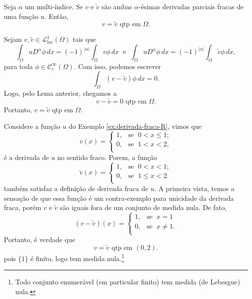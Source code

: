 \documentclass[a4paper, 11pt]{book}
\theoremstyle{definition}
\newcommand{\cC}{\mathcal{C}}
\newcommand{\cL}{\mathcal{L}}
\begin{document}
\begin{pbox}
    Seja $\alpha$ um multi-índice. Se $v$ e $\tilde v$ são ambas $\alpha$-ésimas derivadas parciais fracas de uma função $u$.
    Então,
    \[
        v = \tilde v \text{ qtp em } \Omega.
    \]
\end{pbox}
\begin{prf}
    Sejam $v, \tilde v \in \cL^1_{\mathrm{loc}}(\Omega)$ tais que
    \[
        \int_\Omega u D^\alpha \phi \,dx = (-1)^{|\alpha|} \int_\Omega v \phi \,dx \;\text{ e }\; \int_\Omega u D^\alpha \phi \, dx= (-1)^{|\alpha|}\int_\Omega \tilde v \phi \,dx,
    \]
    para toda $\phi \in \cC^\infty_c(\Omega)$. Com isso, podemos escrever
    \[
        \int_\Omega (v - \tilde v) \phi \, dx = 0.
    \]
    Logo, pelo Lema anterior, chegamos a
    \[
        v - \tilde v = 0 \text{ qtp em } \Omega.
    \]
    Portanto, $v = \tilde v$ qtp em $\Omega$.
\end{prf}

\begin{ex}
    Considere a função $u$ do Exemplo \ref{ex:derivada-fraca-R}, vimos que
    \[
        v(x) = \left\{
            \begin{array}{rl}
                1, & \!\text{se }\; 0 < x \leqslant 1;\\
                0, & \!\text{se }\; 1 < x < 2,\\
            \end{array}
        \right.
    \]
    é a derivada de $u$ no sentido fraco.
    Porem, a função
    \[
        \tilde v(x) = \left\{
            \begin{array}{rl}
                1, & \text{se }\; 0 < x < 1;\\
                0, & \text{se }\; 1 \leqslant x < 2.\\
            \end{array}
        \right.
    \]
    também satisfaz a definição de derivada fraca de $u$.
    A primeira vista, temos a sensação de que essa função é um contra-exemplo para unicidade da derivada fraca, porém $v$ e $\tilde v$ são iguais fora de um conjunto de medida nula.
    De fato,
    \[
        (v - \tilde v)(x) = \left\{
            \begin{array}{rl}
                1, & \text{se }\; x = 1\\
                0, & \text{se }\; x \neq 1.\\
            \end{array}
        \right.
    \]
    Portanto, é verdade que
    \[
        v = \tilde v \text{ qtp em } (0,2).
    \]
    pois $\{1\}$ é finito, logo tem medida nula.\footnote{Todo conjunto enumerável (em particular finito) tem medida (de Lebesgue) nula.}
\end{ex}
\end{document}
